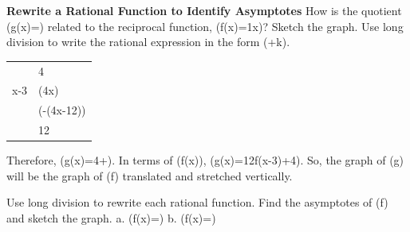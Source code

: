 \documentclass{article}
\newenvironment{example}[1]{}{}         %
\newenvironment{tryit}[1]{}{}           %
\newcommand{\answer}[1]{}               %
\newcommand{\placeholder}[2]{}          %
\newcommand{\te}[1]{}                   %
\begin{document}
\begin{example}{1}
\textbf{Rewrite a Rational Function to Identify Asymptotes}
How is the quotient (g(x)=) related to the reciprocal function, (f(x)=\frac1x)? Sketch the graph.
Use long division to write the rational expression in the form (+k).
\begin{tabular}{rl}
 & 4 \\
x-3 & (4x) \\
 & (-(4x-12)) \\
 & 12 \\
\end{tabular}
\te{USE STRUCTURE: Rewriting in this way is similar to rewriting an improper fraction as a mixed number.}
Therefore, (g(x)=4+).
In terms of (f(x)), (g(x)=12\cdot f(x-3)+4).
So, the graph of (g) will be the graph of (f) translated and stretched vertically.
\te{The vertical asymptote (x=3) is 3 units to the right of the asymptote of (f). The horizontal asymptote of (g), (y=4) is 4 units up from the asymptote of (f).}
\placeholder{graph}{Red g(x)=4x/(x-3), axes x,y and g label; window x -14 to14,y -14 to22, grid2, labels every4, origin0. Blue dashed vertical x=3; green dashed horizontal y=4 with arrowheads. Red branches have arrows at four ends, cross origin, approach y=4 from below left and above right. Left callouts describe vertical asymptote x3 shifted right3 and horizontal asymptote y4 shifted up4.}
\answer{The graph of the parent function (f) has been stretched vertically by a factor of 12, shifted up 4 units and then right 3 units.}
\end{example}
\begin{tryit}{1}
Use long division to rewrite each rational function. Find the asymptotes of (f) and sketch the graph.
a. (f(x)=)
b. (f(x)=)
\answer{a. (f(x)=3-\frac3{2x+1}); vertical asymptote: (x=-\frac12); horizontal asymptote: (y=3). b. (f(x)=1+\frac6{x-6}); vertical asymptote: (x=6); horizontal asymptote: (y=1).}
\placeholder{graph}{Try It 1a red curve 3-3/(2x+1), axes x,y,O, window -5 to5 both, unit grid, labels -4,-2,2,4. Left branch above y3 and right below, four end arrows, crosses origin, vertical asymptote x=-0.5 not drawn.}
\placeholder{graph}{Try It 1b red 1+6/(x-6), window -10 to10 both, grid2, labels -8,-4,4,8; axes x,y,O. Dashed blue x6,y1 with arrowheads; red branches cross origin and have four end arrows.}
\end{tryit}
\end{document}
